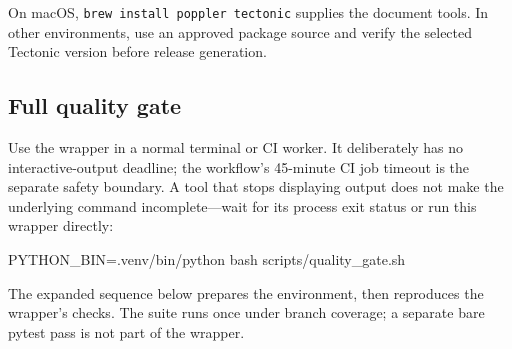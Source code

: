 \documentclass[
]{article}
\newenvironment{Shaded}{}{}
\newcommand{\FunctionTok}[1]{\textcolor[rgb]{0.02,0.16,0.49}{#1}}
\newcommand{\NormalTok}[1]{#1}
\newcommand{\OperatorTok}[1]{\textcolor[rgb]{0.40,0.40,0.40}{#1}}
\newcommand{\VariableTok}[1]{\textcolor[rgb]{0.10,0.09,0.49}{#1}}
\begin{document}
On macOS, \texttt{brew\ install\ poppler\ tectonic} supplies the
document tools. In other environments, use an approved package source
and verify the selected Tectonic version before release generation.

\subsection{Full quality gate}\label{full-quality-gate}

Use the wrapper in a normal terminal or CI worker. It deliberately has
no interactive-output deadline; the workflow's 45-minute CI job timeout
is the separate safety boundary. A tool that stops displaying output
does not make the underlying command incomplete---wait for its process
exit status or run this wrapper directly:

\begin{Shaded}
\begin{Highlighting}[]
\VariableTok{PYTHON\_BIN}\OperatorTok{=}\NormalTok{.venv/bin/python }\FunctionTok{bash}\NormalTok{ scripts/quality\_gate.sh}
\end{Highlighting}
\end{Shaded}

The expanded sequence below prepares the environment, then reproduces
the wrapper's checks. The suite runs once under branch coverage; a
separate bare pytest pass is not part of the wrapper.
\end{document}
